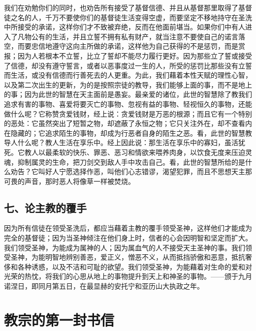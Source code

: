我们在劝勉你们的同时，也劝告所有接受了基督信德、并且从基督那里取得了基督徒之名的人，千万不要使你们的基督徒生活变得空虚，而要坚定不移地持守在圣洗中所接受的承诺，这样你们才不致被弃绝，反而在他面前堪当。如果你们中有人进入了凡物公有的生活，并且立誓不拥有私有财产，就当注意不要使自己的诺言落空，而要忠信地遵守这向主所做的承诺，这样他为自己获得的不是惩罚，而是赏报；因为人若根本不立誓，比立了誓却不能尽力履行更好。因为那些立了誓或接受了信德，却没有遵守誓言，或者以恶事度过一生的人，所受的惩罚比那些没有立誓而生活，或没有信德而行善死去的人更重。为此，我们藉着本性天赋的理性心智，以及第二次出生的更新，为的是按照宗徒的教导，我们能够上面的事，而不是地上的事；因为此世的智慧在天主面前是愚妄。最亲爱的诸位，此世的智慧除了教我们追求有害的事物、喜爱将要灭亡的事物、忽视有益的事物、轻视恒久的事物，还能做什么呢？它称赞贪爱钱财，经上说：贪爱钱财是万恶的根源；而且它有一个特别的恶处：它虽然突出了短暂之物，却遮蔽了永恒之物；它只关注外在，却不查看内在隐藏的；它追求陌生的事物，却成为行恶者自身的陌生之恶。看，此世的智慧教导人什么呢？教人生活在享乐中。经上因此说：那生活在享乐中的寡妇，虽活犹死。它教人以最柔软的快乐、罪恶、恶习和情欲来喂养肉身，以饮食无度来压迫灵魂，抑制属灵的生命，把刀剑交到敌人手中攻击自己。看，此世的智慧所给的是什么劝告？它叫好人宁愿选择作恶，叫他们心志错谬，渴望犯罪，而且不思想天主那可畏的声音，那时恶人将像草一样被焚烧。\par


\subsection{七、论主教的覆手}

因为所有信徒在领受圣洗后，都应当藉着主教的覆手领受圣神，这样他们才能成为完全的基督徒；因为当圣神倾注在他们身上时，信者的心会因明智和坚定而扩大。我们领受圣神，为能成为属神的人；因为属血气的人不接受天主圣神的事。我们领受圣神，为能明智地辨别善恶，爱正义，憎恶不义，从而抵挡骄傲和恶意，抵抗奢侈和各种诱惑，以及不洁和可耻的欲望。我们领受圣神，为能藉着对生命的爱和对光荣的热忱，将我们的心思从地上的事物提升到天上和神圣的事物。——颁于九月诺涅日，即同月第五日，在最显赫的安托宁和亚历山大执政之年。\par


\section{教宗的第一封书信}

